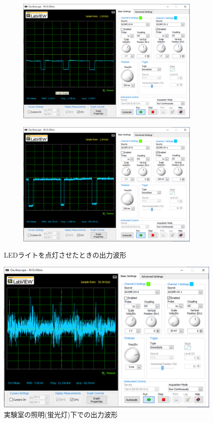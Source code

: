 \begin{figure}
	\centering
	\begin{subfigure}{0.45\textwidth}
		\centering
		\includegraphics[width=\textwidth]{src/figures/exp4/led.png}
		\label{subfig:exp4-led}
	\end{subfigure}
	\begin{subfigure}{0.45\textwidth}
		\centering
		\includegraphics[width=\textwidth]{src/figures/exp4/photo-diode.png}
		\label{subfig:exp4-photo-diode}
	\end{subfigure}
	\caption{LEDライトを点灯させたときの出力波形}\label{fig:exp4-led}
\end{figure}

\begin{figure}
	\centering
	\includegraphics[width=0.6\linewidth]{src/figures/exp4/f-lamp.png}
	\caption{実験室の照明(蛍光灯)下での出力波形}\label{fig:exp4-f-lamp}
\end{figure}
